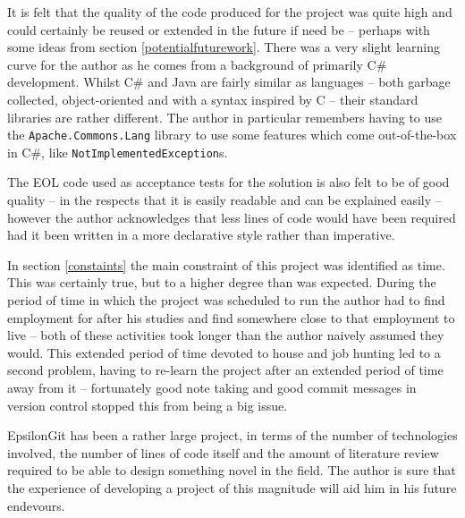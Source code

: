 \documentclass[11pt]{book}
\newcommand{\code}[1]{\texttt{#1}}
\begin{document}
It is felt that the quality of the code produced for the project was quite high and could certainly be reused or extended in the future if need be -- perhaps with some ideas from section \ref{potentialfuturework}. There was a very slight learning curve for the author as he comes from a background of primarily C\# development. Whilst C\# and Java are fairly similar as languages -- both garbage collected, object-oriented and with a syntax inspired by C -- their standard libraries are rather different. The author in particular remembers having to use the \code{Apache.Commons.Lang} library to use some features which come out-of-the-box in C\#, like \code{NotImplementedException}s.

The EOL code used as acceptance tests for the solution is also felt to be of good quality -- in the respects that it is easily readable and can be explained easily -- however the author acknowledges that less lines of code would have been required had it been written in a more declarative style rather than imperative. 

In section \ref{constaints} the main constraint of this project was identified as time. This was certainly true, but to a higher degree than was expected. During the period of time in which the project was scheduled to run the author had to find employment for after his studies and find somewhere close to that employment to live -- both of these activities took longer than the author naively assumed they would. This extended period of time devoted to house and job hunting led to a second problem, having to re-learn the project after an extended period of time away from it -- fortunately good note taking and good commit messages in version control stopped this from being a big issue. 

EpsilonGit has been a rather large project, in terms of the number of technologies involved, the number of lines of code itself and the amount of literature review required to be able to design something novel in the field. The author is sure that the experience of developing a project of this magnitude will aid him in his future endevours.

\printbibliography
\end{document}
